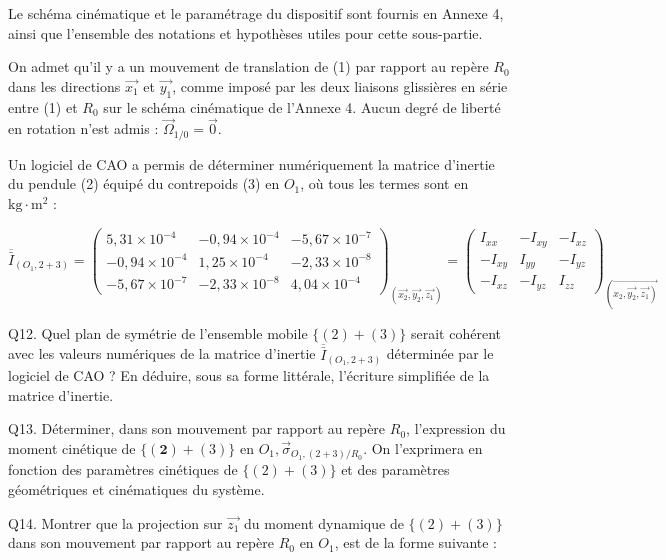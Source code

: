 {Le schéma cinématique et le paramétrage du dispositif sont fournis en Annexe 4, ainsi que l'ensemble des notations et hypothèses utiles pour cette sous-partie.

On admet qu'il y a un mouvement de translation de (1) par rapport au repère $R_{0}$ dans les directions $\overrightarrow{x_{1}}$ et $\overrightarrow{y_{1}}$, comme imposé par les deux liaisons glissières en série entre (1) et $R_{0}$ sur le schéma cinématique de l'Annexe 4. Aucun degré de liberté en rotation n'est admis : $\vec{\Omega}_{1 / 0}=\overrightarrow{0}$.

Un logiciel de CAO a permis de déterminer numériquement la matrice d'inertie du pendule (2) équipé du contrepoids (3) en $O_{1}$, où tous les termes sont en $\mathrm{kg} \cdot \mathrm{m}^{2}$ :

$$
\overline{\bar{I}}_{\left(O_{1}, 2+3\right)}=\left(\begin{array}{ccc}
5,31 \times 10^{-4} & -0,94 \times 10^{-4} & -5,67 \times 10^{-7} \\
-0,94 \times 10^{-4} & 1,25 \times 10^{-4} & -2,33 \times 10^{-8} \\
-5,67 \times 10^{-7} & -2,33 \times 10^{-8} & 4,04 \times 10^{-4}
\end{array}\right)_{\left(\overrightarrow{x_{2}}, \overrightarrow{y_{2}}, \overrightarrow{z_{1}}\right)}=\left(\begin{array}{ccc}
I_{x x} & -I_{x y} & -I_{x z} \\
-I_{x y} & I_{y y} & -I_{y z} \\
-I_{x z} & -I_{y z} & I_{z z}
\end{array}\right)_{\left(\overrightarrow{\left.x_{2}, \overrightarrow{y_{2}}, \overrightarrow{z_{1}}\right)}\right.}
$$

Q12. Quel plan de symétrie de l'ensemble mobile $\{(2)+(3)\}$ serait cohérent avec les valeurs numériques de la matrice d'inertie $\overline{\bar{I}}_{\left(O_{1}, 2+3\right)}$ déterminée par le logiciel de CAO ? En déduire, sous sa forme littérale, l'écriture simplifiée de la matrice d'inertie.

Q13. Déterminer, dans son mouvement par rapport au repère $R_{0}$, l'expression du moment cinétique de $\{(\mathbf{2})+(3)\}$ en $O_{1}, \vec{\sigma}_{O_{1},(2+3) / R_{0}}$. On l'exprimera en fonction des paramètres cinétiques de $\{(2)+(3)\}$ et des paramètres géométriques et cinématiques du système.

Q14. Montrer que la projection sur $\overrightarrow{z_{1}}$ du moment dynamique de $\{(2)+(3)\}$ dans son mouvement par rapport au repère $R_{0}$ en $O_{1}$, est de la forme suivante :

}
